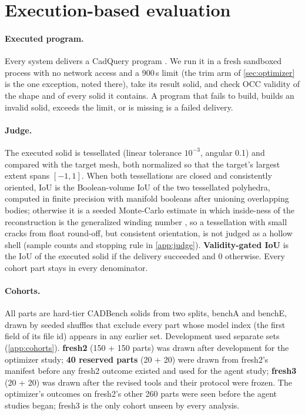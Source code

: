 \section{Execution-based evaluation}
\label{sec:protocol}

\paragraph{Executed program.} Every system delivers a CadQuery program \citep{cadquery}. We run it in a fresh sandboxed process with no network access and a 900\,s limit (the trim arm of \cref{sec:optimizer} is the one exception, noted there), take its result solid, and check OCC validity of the shape and of every solid it contains. A program that fails to build, builds an invalid solid, exceeds the limit, or is missing is a failed delivery.

\paragraph{Judge.} The executed solid is tessellated (linear tolerance $10^{-3}$, angular 0.1) and compared with the target mesh, both normalized so that the target's largest extent spans $[-1,1]$. When both tessellations are closed and consistently oriented, IoU is the Boolean-volume IoU of the two tessellated polyhedra, computed in finite precision with manifold booleans \citep{manifold3d} after unioning overlapping bodies; otherwise it is a seeded Monte-Carlo estimate in which inside-ness of the reconstruction is the generalized winding number \citep{jacobson2013winding}, so a tessellation with small cracks from float round-off, but consistent orientation, is not judged as a hollow shell (sample counts and stopping rule in \cref{app:judge}). \textbf{Validity-gated IoU} is the IoU of the executed solid if the delivery succeeded and 0 otherwise. Every cohort part stays in every denominator.

\paragraph{Cohorts.} All parts are hard-tier CADBench \citep{doris2026cadbench} solids from two splits, benchA and benchE, drawn by seeded shuffles that exclude every part whose model index (the first field of its file id) appears in any earlier set. Development used separate sets (\cref{app:cohorts}). \textbf{fresh2} (150 + 150 parts) was drawn after development for the optimizer study; \textbf{40 reserved parts} (20 + 20) were drawn from fresh2's manifest before any fresh2 outcome existed and used for the agent study; \textbf{fresh3} (20 + 20) was drawn after the revised tools and their protocol were frozen. The optimizer's outcomes on fresh2's other 260 parts were seen before the agent studies began; fresh3 is the only cohort unseen by every analysis.

